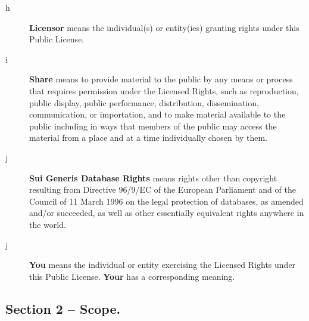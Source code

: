 \documentclass[12pt,a4paper]{article}
\begin{document}
\begin{description}
\item[h] {\bf Licensor} means the individual(s) or entity(ies) granting rights under this Public License.
\item[i] {\bf Share} means to provide material to the public by any means or process that requires permission under the Licensed Rights, such as reproduction, public display, public performance, distribution, dissemination, communication, or importation, and to make material available to the public including in ways that members of the public may access the material from a place and at a time individually chosen by them.
\item[j] {\bf Sui Generis Database Rights} means rights other than copyright resulting from Directive 96/9/EC of the European Parliament and of the Council of 11 March 1996 on the legal protection of databases, as amended and/or succeeded, as well as other essentially equivalent rights anywhere in the world.
\item[j] {\bf You} means the individual or entity exercising the Licensed Rights under this Public License. {\bf Your} has a corresponding meaning.
\end{description}
  
\subsection*{Section 2 – Scope.}
\end{document}
